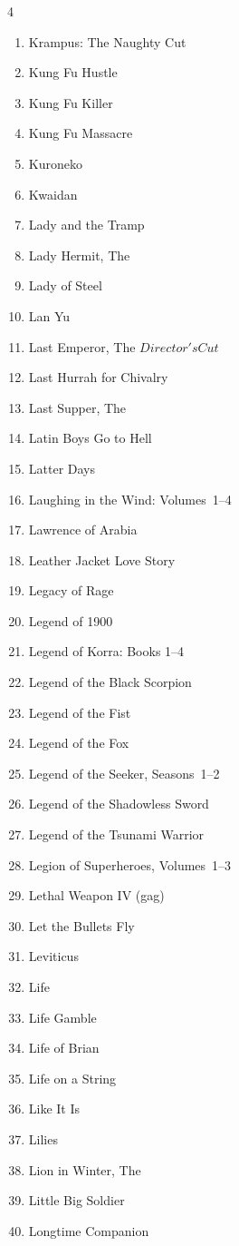 \documentclass{article}
\begin{document}
\begin{multicols}{4}
\begin{enumerate}
\item Krampus: The Naughty Cut
\item Kung Fu Hustle
\item Kung Fu Killer
\item Kung Fu Massacre
\item Kuroneko
\item Kwaidan
\item Lady and the Tramp
\item Lady Hermit, The
\item Lady of Steel
\item Lan Yu
\item Last Emperor, The \(Director's Cut\)
\item Last Hurrah for Chivalry
\item Last Supper, The
\item Latin Boys Go to Hell
\item Latter Days
\item Laughing in the Wind: Volumes~1--4
\item Lawrence of Arabia
\item Leather Jacket Love Story
\item Legacy of Rage
\item Legend of 1900
\item Legend of Korra: Books 1--4
\item Legend of the Black Scorpion
\item Legend of the Fist
\item Legend of the Fox
\item Legend of the Seeker, Seasons~1--2
\item Legend of the Shadowless Sword
\item Legend of the Tsunami Warrior
\item Legion of Superheroes, Volumes~1--3
\item Lethal Weapon IV (gag)
\item Let the Bullets Fly
\item Leviticus
\item Life
\item Life Gamble
\item Life of Brian
\item Life on a String
\item Like It Is
\item Lilies
\item Lion in Winter, The
\item Little Big Soldier
\item Longtime Companion

\end{enumerate}
\end{multicols}
\end{document}
